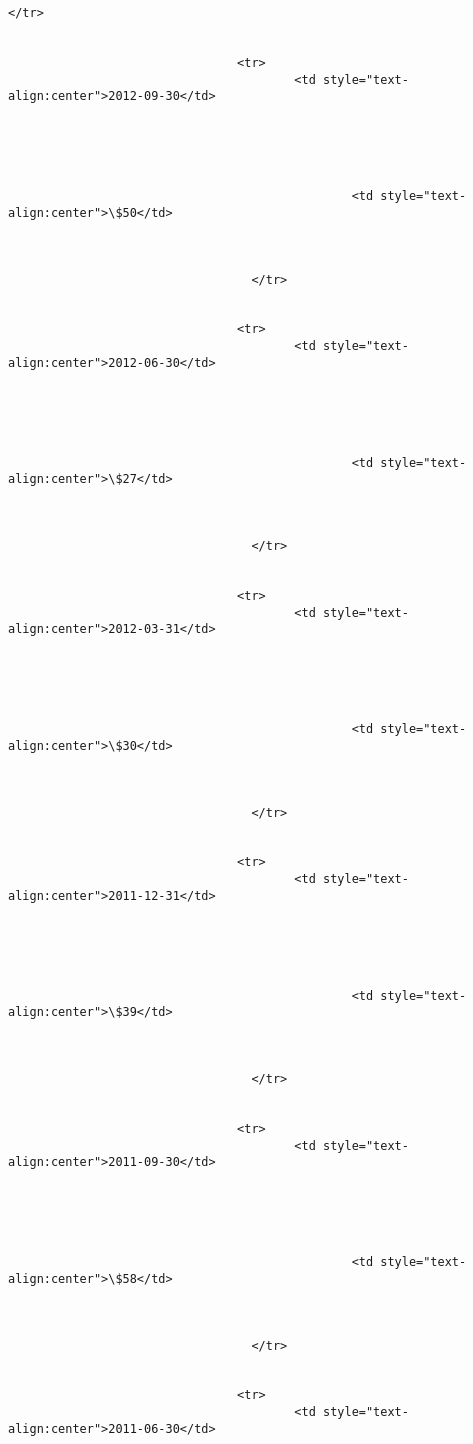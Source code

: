 \documentclass[11pt]{article}
\begin{document}
\begin{Verbatim}[commandchars=\\\{\}]
                                  </tr>


                                <tr>
                                        <td style="text-
align:center">2012-09-30</td>





                                                <td style="text-
align:center">\$50</td>



                                  </tr>


                                <tr>
                                        <td style="text-
align:center">2012-06-30</td>





                                                <td style="text-
align:center">\$27</td>



                                  </tr>


                                <tr>
                                        <td style="text-
align:center">2012-03-31</td>





                                                <td style="text-
align:center">\$30</td>



                                  </tr>


                                <tr>
                                        <td style="text-
align:center">2011-12-31</td>





                                                <td style="text-
align:center">\$39</td>



                                  </tr>


                                <tr>
                                        <td style="text-
align:center">2011-09-30</td>





                                                <td style="text-
align:center">\$58</td>



                                  </tr>


                                <tr>
                                        <td style="text-
align:center">2011-06-30</td>






\end{Verbatim}
\end{document}
